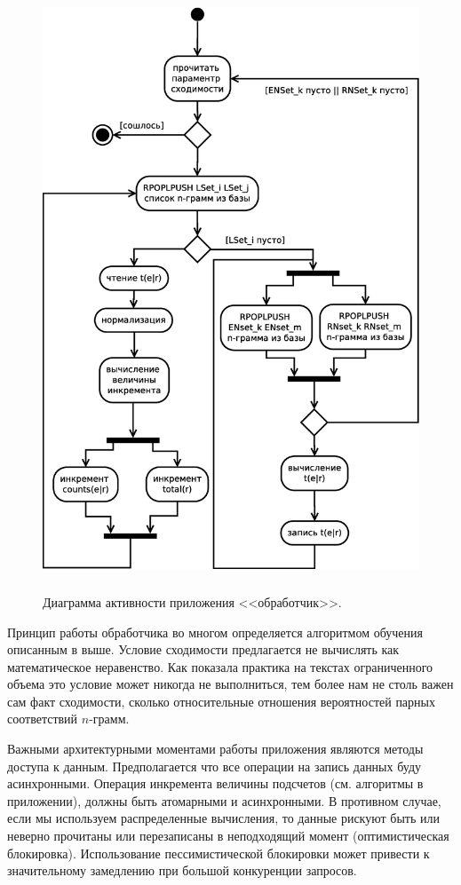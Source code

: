 \begin{figure}[H]
	\begin{center}
		\includegraphics[height=18.0cm]{./vec/arch-handler.eps}
	\end{center}
	\caption{Диаграмма активности приложения <<обработчик>>.}
\end{figure}

\pagebreak

Принцип работы обработчика во многом определяется алгоритмом обучения описанным 
в выше. 
Условие сходимости предлагается не вычислять как математическое неравенство.
Как показала практика на текстах ограниченного объема это условие может никогда не выполниться,
тем более нам не столь важен сам факт сходимости, сколько относительные отношения вероятностей
парных соответствий $n$-грамм. 

Важными архитектурными моментами работы приложения 
являются методы доступа к данным. 
Предполагается что все операции на запись данных буду асинхронными.
Операция инкремента величины подсчетов (см. алгоритмы в приложении),
должны быть атомарными и асинхронными. В противном случае, 
если мы используем распределенные вычисления, то данные рискуют быть 
или неверно прочитаны или перезаписаны в неподходящий момент (оптимистическая блокировка).
Использование пессимистической блокировки может привести 
к значительному замедлению при большой конкуренции запросов.

